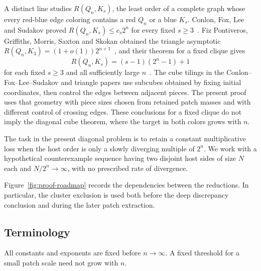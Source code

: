 A distinct line studies $R(Q_n,K_s)$, the least order of a complete graph
whose every red-blue edge coloring contains a red $Q_n$ or a blue $K_s$.
Conlon, Fox, Lee and Sudakov proved $R(Q_n,K_s)\le c_s2^n$ for every fixed
$s\ge3$~\cite[Theorem~1.1]{conlon-fox-lee-sudakov2016}.
Fiz Pontiveros, Griffiths, Morris, Saxton and Skokan obtained the triangle
asymptotic $R(Q_n,K_3)=(1+o(1))2^{n+1}$~\cite[Theorem~1.1]{fiz-pontiveros-griffiths-morris-saxton-skokan2016},
and their theorem for a fixed clique gives
\[
R(Q_n,K_s)=(s-1)(2^n-1)+1
\]
for each fixed $s\ge3$ and all sufficiently large $n$~\cite[Theorem~1.1]{fiz-pontiveros-griffiths-morris-saxton-skokan2014}.
The cube tilings in the Conlon--Fox--Lee--Sudakov and triangle papers use
subcubes obtained by fixing initial coordinates, then control the edges
between adjacent pieces. The present proof uses that geometry with piece
sizes chosen from retained patch masses and with different control of
crossing edges. These conclusions for a fixed clique do not imply the diagonal
cube theorem, where the target in both colors grows with $n$.

The task in the present diagonal problem is to retain a constant
multiplicative loss when the host order is only a slowly diverging multiple
of $2^n$. We work with a hypothetical counterexample sequence having two
disjoint host sides of size $N$ each and $N/2^n\to\infty$, with no
prescribed rate of divergence.



Figure~\ref{fig:proof-roadmap} records the dependencies between the
reductions. In particular, the cluster exclusion is used both before the
deep discrepancy conclusion and during the later patch extraction.


\subsection{Terminology}

All constants and exponents are fixed before $n\to\infty$. A fixed
threshold for a small patch scale need not grow with $n$.

